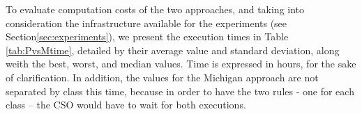 \documentclass[runningheads]{llncs}
\begin{document}

To evaluate computation costs of the two approaches, and taking into consideration the infrastructure available for the experiments (see Section\ref{sec:experiments}), we present the execution times in Table \ref{tab:PvsMtime}, detailed by their average value and standard deviation, along weith the best, worst, and median values. Time is expressed in hours, for the sake of clarification. In addition, the values for the Michigan approach are not separated by class this time, because in order to have the two rules - one for each class -- the CSO would have to wait for both executions.
\end{document}
